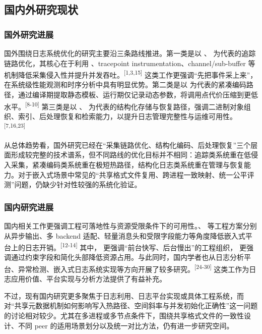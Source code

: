 \subsection{国内外研究现状}\label{ux56fdux5185ux5916ux7814ux7a76ux73b0ux72b6}

\subsubsection{国外研究进展}\label{ux56fdux5916ux7814ux7a76ux8fdbux5c55}

国外围绕日志系统优化的研究主要沿三条路线推进。第一类是以 、 为代表的追踪链路优化，其核心在于利用 、tracepoint instrumentation、channel/sub-buffer 等机制降低采集侵入性并提升并发吞吐。\textsuperscript{[1,3,15]} 这类工作更强调``先把事件采上来''，在系统级性能观测和时序分析中具有明显优势。第二类是以  为代表的紧凑编码路径，通过编译期提取静态模板、运行期仅记录动态参数，将调用点代价压缩到更低水平。\textsuperscript{[8-10]} 第三类是以 、 为代表的结构化存储与恢复路径，强调二进制对象组织、索引、后处理恢复和检索能力，以提升日志管理完整性与运维可用性。\textsuperscript{[7,16,23]}

从总体趋势看，国外研究已经在``采集链路优化、结构化编码、后处理恢复''三个层面形成较完整的技术谱系，但不同路线的优化目标并不相同：追踪类系统重在低侵入采集，紧凑编码类系统重在极短热路径，结构化日志类系统重在管理与恢复能力。对于嵌入式场景中常见的``共享格式文件复用、跨进程一致映射、统一公平评测''问题，仍缺少针对性较强的系统化验证。

\subsubsection{国内研究进展}\label{ux56fdux5185ux7814ux7a76ux8fdbux5c55}

国内相关工作更强调工程可落地性与资源受限条件下的可用性。、 等工程方案分别从异步输出、多 backend 适配、轻量消息头和受限字段能力等角度降低嵌入式平台上的日志开销。\textsuperscript{[12-14]} 其中， 更强调``前台快写、后台慢出''的工程组织， 更强调通过约束字段和简化头部降低资源占用。与此同时，国内学者也从日志分析平台、异常检测、嵌入式日志系统实现等方向开展了较多研究。\textsuperscript{[24-30]} 这类工作为日志应用价值、平台实现与分析方法提供了有益补充。

不过，现有国内研究更多聚焦于日志利用、日志平台实现或具体工程系统，而对``共享元数据机制如何影响写入热路径、空间斜率与并发初始化正确性''这一问题的讨论相对较少。尤其在多进程或多节点条件下，围绕共享格式文件的一致性设计、不同 peer 的适用场景划分以及统一对比方法，仍有进一步研究空间。

